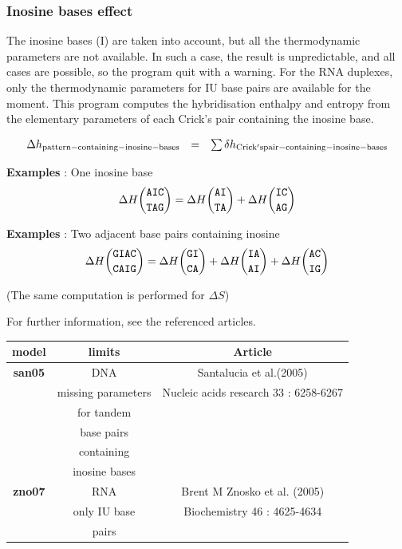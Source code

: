\documentclass{article}
\begin{document}
\subsubsection{Inosine bases effect}

The inosine bases (I) are taken into account, but all the thermodynamic parameters are not available. 
In such a case, the result is unpredictable, and all cases are possible, so the
program quit with a warning. For the RNA duplexes, only the thermodynamic parameters
for IU base pairs are available for the moment.
This program computes the hybridisation enthalpy and entropy from the elementary 
parameters of each Crick's pair containing the inosine base.

\begin{displaymath}
  \begin{array}[t]{ccc}
  \Delta{}h_\mathrm{pattern-containing-inosine-bases}&=&\sum
  \delta{}h_\mathrm{Crick's pair-containing-inosine-bases}\\
  \end{array}
\end{displaymath}

\textbf{Examples} : One inosine base
\begin{multline*}
\Delta H {\mbox{\texttt{AIC}} \choose \mbox{\texttt{TAG}}} = 
\Delta H {\mbox{\texttt{AI}} \choose \mbox{\texttt{TA}}} +
\Delta H {\mbox{\texttt{IC}} \choose \mbox{\texttt{AG}}}\\
\end{multline*}

\textbf{Examples} : Two adjacent base pairs containing inosine
\begin{multline*}
\Delta H {\mbox{\texttt{GIAC}} \choose \mbox{\texttt{CAIG}}} = 
\Delta H {\mbox{\texttt{GI}} \choose \mbox{\texttt{CA}}} +
\Delta H {\mbox{\texttt{IA}} \choose \mbox{\texttt{AI}}} +
\Delta H {\mbox{\texttt{AC}} \choose \mbox{\texttt{IG}}}\\
\end{multline*}

       (The same computation is performed for $\Delta S$) 
       
For further information, see the referenced articles.

\begin{table}[hc]
\begin{tabular}[h]{| c | c | c |}
\textbf{model} & \textbf{limits} & \textbf{Article} \\
\hline
\textbf{san05} & DNA & Santalucia et al.(2005)\\
 & missing parameters & Nucleic acids research 33 : 6258-6267 \\
 & for tandem & \\
 & base pairs & \\
 & containing & \\
 & inosine bases & \\
 \hline
\textbf{zno07} & RNA & Brent M Znosko et al. (2005)\\
 & only IU base & Biochemistry 46 : 4625-4634 \\
 & pairs & \\
 \hline
\end{tabular}
\end{table}
\end{document}
